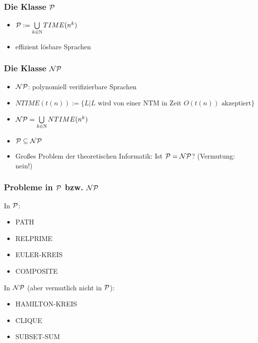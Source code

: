 \documentclass{beamer}
\newcommand{\N}{\ensuremath \mathbb{N}}
\renewcommand{\P}{\ensuremath \mathcal{P}}
\newcommand{\NP}{\ensuremath \mathcal{NP}}
\begin{document}
\begin{frame}
\frametitle{Die Klasse $\P$}
\begin{itemize}
\item $\P:=\bigcup\limits_{k\in\N} TIME(n^k)$
\item effizient lösbare Sprachen
\end{itemize}
\end{frame}

\begin{frame}
\frametitle{Die Klasse $\NP$}
\begin{itemize}
\item $\NP$: polynomiell verifizierbare Sprachen\pause
\item $NTIME(t(n)):=\{L|L\text{ wird von einer NTM in Zeit $O(t(n))$ akzeptiert}\}$
\item $\NP=\bigcup\limits_{k\in\N} NTIME(n^k)$\pause
\item $\P\subseteq\NP$
\item Großes Problem der theoretischen Informatik: Ist $\P=\NP$? (Vermutung: nein!)
\end{itemize}
\end{frame}

\begin{frame}
\frametitle{Probleme in $\P$ bzw. $\NP$}
In $\P$:
\begin{itemize}
\item PATH
\item RELPRIME
\item EULER-KREIS
\item COMPOSITE
\end{itemize}
In $\NP$ (aber vermutlich nicht in $\P$):
\begin{itemize}
\item HAMILTON-KREIS
\item CLIQUE
\item SUBSET-SUM
\end{itemize}
\end{frame}
\end{document}
